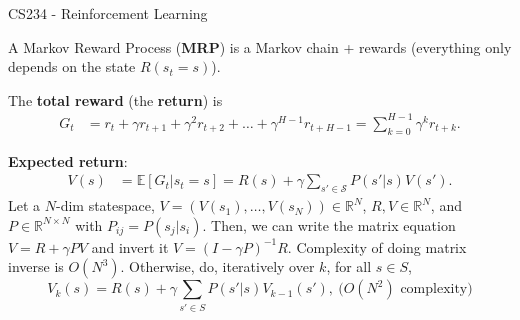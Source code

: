 \documentclass[10pt,landscape]{article}
\makeatletter
\renewcommand{\section}{\@startsection{section}{1}{0mm}%
                                {-1ex plus -.5ex minus -.2ex}%
                                {0.5ex plus .2ex}%
                                {\normalfont\large\bfseries}}
\makeatother
\begin{document}
\raggedright
\footnotesize
\begin{multicols}{3}

\setlength{\premulticols}{1pt}
\setlength{\postmulticols}{1pt}
\setlength{\multicolsep}{1pt}
\setlength{\columnsep}{2pt}

\newlength{\MyLen}

\begin{center}
\centering\Large{CS234 - Reinforcement Learning}\phantom{---}
\end{center}



\vspace{1mm}

A Markov Reward Process (\textbf{MRP}) is a Markov chain + rewards (everything only depends on the state $R(s_t=s)$).


The \textbf{total reward} (the \textbf{return}) is 
\vspace{-3mm}
\begin{align*}
G_t &= r_t+\gamma r_{t+1}+\gamma^2 r_{t+2}+\dots
+
\gamma^{H-1}r_{t+H-1}
=
\sum_{k = 0}^{H-1} \gamma^kr_{t + k}.
\end{align*}
\vspace{-4mm}

\textbf{Expected return}: 
\begin{align*}
V(s)&=\mathbb{E}[G_t|s_t=s]
=
R(s)+\gamma\sum_{s'\in\mathcal{S}}P(s'|s)V(s').
\end{align*}
Let a $N$-dim statespace,  $V=(V(s_1),\dots,V(s_N))\in\mathbb{R}^N$, $R,V\in\mathbb{R}^N$, and $P\in\mathbb{R}^{N\times N}$ with $P_{ij}=P(s_j|s_i)$. Then, we can write the matrix equation $V=R+\gamma PV$ and invert it $V=(I-\gamma P)^{-1}R$.  Complexity of doing matrix inverse is $O(N^3)$. Otherwise, do,  iteratively over $k$, for all $s\in S$, 
$$
V_k(s)=R(s)+\gamma\sum_{s'\in S}P(s'|s)V_{k-1}(s'),
\ \text{($O(N^2)$ complexity)}$$



\end{multicols}
\end{document}

